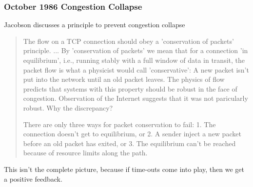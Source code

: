 \subsubsection{October 1986 Congestion Collapse}

Jacobson \cite{jocobson1988} discusses a principle to prevent congestion collapse

\begin{quote}
    The flow on a TCP connection should obey a 'conservation of packets' principle. ... By
    'conservation of packets' we mean that for a connection 'in equilibrium', i.e., running stably
    with a full window of data in transit, the packet flow is what a physicist would call
    'conservative': A new packet isn't put into the network until an old packet leaves. The physics
    of flow predicts that systems with this property should be robust in the face of congestion.
    Observation of the Internet suggests that it was not paricularly robust. Why the discrepancy?

    There are only three ways for packet conservation to fail:
    1. The connection doesn't get to equilibrium, or
    2. A sender inject a new packet before an old packet has exited, or
    3. The equilibrium can't be reached because of resource limits along the path.
\end{quote}

This isn't the complete picture, because if time-outs come into play, then we get a positive
feedback.




